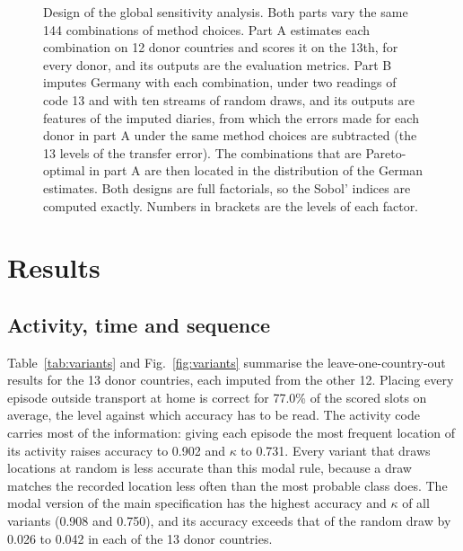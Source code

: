 \documentclass[a4paper]{article}
\begin{document}
\begin{figure}[ht]
  \caption{Design of the global sensitivity analysis. Both parts vary the same 144 combinations of method choices. Part A estimates each combination on 12 donor countries and scores it on the 13th, for every donor, and its outputs are the evaluation metrics. Part B imputes Germany with each combination, under two readings of code 13 and with ten streams of random draws, and its outputs are features of the imputed diaries, from which the errors made for each donor in part A under the same method choices are subtracted (the 13 levels of the transfer error). The combinations that are Pareto-optimal in part A are then located in the distribution of the German estimates. Both designs are full factorials, so the Sobol' indices are computed exactly. Numbers in brackets are the levels of each factor.}
  \label{fig:design}
\end{figure}

\section{Results}
\label{sec:results}

\subsection{Activity, time and sequence}
\label{sec:res_variants}

Table~\ref{tab:variants} and Fig.~\ref{fig:variants} summarise the leave-one-country-out results for the 13 donor countries, each imputed from the other 12. Placing every episode outside transport at home is correct for 77.0\% of the scored slots on average, the level against which accuracy has to be read. The activity code carries most of the information: giving each episode the most frequent location of its activity raises accuracy to 0.902 and $\kappa$ to 0.731. Every variant that draws locations at random is less accurate than this modal rule, because a draw matches the recorded location less often than the most probable class does. The modal version of the main specification has the highest accuracy and $\kappa$ of all variants (0.908 and 0.750), and its accuracy exceeds that of the random draw by 0.026 to 0.042 in each of the 13 donor countries.
\end{document}
